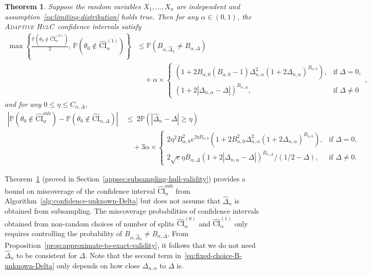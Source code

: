 \documentclass{article}
\newcommand{\ahulc}{\textsc{Adaptive HulC}~}
\newtheorem{thm}{Theorem}
\numberwithin{myalgctr}{section}
\begin{document}
\begin{thm}\label{thm:subsampling-hull-validity}
Suppose the random variables $X_1, \ldots, X_n$ are independent and assumption~\ref{eq:limiting-distribution} holds true. Then for any $\alpha\in(0, 1)$, the \ahulc confidence intervals satisfy
\begin{equation}\label{eq:fixed-choice-B-unknown-Delta}
\begin{split}
\max\left\{\frac{\mathbb{P}(\theta_0 \notin \widehat{\mathrm{CI}}_{\alpha}^{(0)})}{2},\,\mathbb{P}(\theta_0 \notin \widehat{\mathrm{CI}}_{\alpha}^{(1)})\right\} &\le \mathbb{P}(B_{\alpha,\widehat{\Delta}_n} \neq B_{\alpha,\Delta})
\\
&\quad
+ \alpha\times
\begin{cases}(1 + 2B_{\alpha,0}(B_{\alpha,0} - 1)\Delta_{n,\alpha}^2(1 + 2\Delta_{n,\alpha})^{B_{\alpha,0}}), &\mbox{if }\Delta = 0,\\
(1 + 2|\Delta_{n,\alpha} - \Delta|)^{B_{\alpha,\Delta}}, &\mbox{if }\Delta \neq 0\end{cases},
\end{split}
\end{equation}
and for any $0 \le \eta \le C_{\alpha,\Delta}$,
\begin{equation}\label{eq:random-choice-B-unknown-Delta}
\begin{split}
\left|\mathbb{P}(\theta_0 \notin \widehat{\mathrm{CI}}_{\alpha}^{\mathrm{sub}}) - \mathbb{P}(\theta_0 \notin \widehat{\mathrm{CI}}_{\alpha,\Delta})\right| ~&\le~ 2\mathbb{P}(|\widehat{\Delta}_n - \Delta| \ge \eta)\\ 
&\quad+ 3\alpha\times
\begin{cases}
2\eta^2B_{\alpha,0}^2e^{2\eta B_{\alpha,0}}(1 + 2B_{\alpha,0}^2\Delta_{n,\alpha}^2(1 + 2\Delta_{n,\alpha})^{B_{\alpha,0}}), &\mbox{if }\Delta = 0,\\
2\sqrt{e}\eta B_{\alpha,\Delta}(1 + 2|\Delta_{n,\alpha}-\Delta|)^{B_{\alpha,\Delta}}/(1/2 - \Delta), &\mbox{if }\Delta \neq 0.
\end{cases}
\end{split}
\end{equation}
\end{thm}
Theorem~\ref{thm:subsampling-hull-validity} (proved in Section~\ref{appsec:subsampling-hull-validity}) provides a bound on miscoverage of the confidence interval $\widehat{\mathrm{CI}}_{\alpha}^{\mathrm{sub}}$ from Algorithm~\ref{alg:confidence-unknown-Delta} but does not assume that $\widehat{\Delta}_n$ is obtained from subsampling. 
The miscoverage probabilities of confidence intervals obtained from non-random choices of number of splits $\widehat{\mathrm{CI}}_{\alpha}^{(0)}$ and $\widehat{\mathrm{CI}}_{\alpha}^{(1)}$ only requires controlling the probability of $B_{\alpha,\widehat{\Delta}_n} \neq B_{\alpha,\Delta}$. From Proposition~\ref{prop:approximate-to-exact-validity}, it follows that we do not need $\widehat{\Delta}_n$ to be consistent for $\Delta$. Note that the second term in~\eqref{eq:fixed-choice-B-unknown-Delta} only depends on how close $\Delta_{n,\alpha}$ to $\Delta$ is. 
\end{document}
